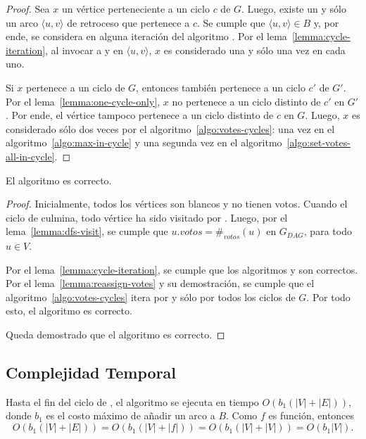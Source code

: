 \begin{proof}
    Sea $x$ un v\'ertice perteneciente a un ciclo $c$ de $G$. Luego, existe un y s\'olo un arco $\langle u, v \rangle$ de retroceso que pertenece a $c$. Se cumple que $\langle u, v \rangle \in B$ y, por ende, se considera en alguna iteraci\'on del algoritmo \cyclevotescaption. Por el lema~\ref{lemma:cycle-iteration}, al invocar a \maxincyclecaption \;y \setvotestoallincyclecaption \;en $\langle u, v \rangle$, $x$ es considerado una y s\'olo una vez en cada uno. 

    Si $x$ pertenece a un ciclo de $G$, entonces tambi\'en pertenece a un ciclo  $c'$ de $G'$. Por el lema~\ref{lemma:one-cycle-only}, $x$ no pertenece a un ciclo distinto de $c'$ en $G'$. Por ende, el v\'ertice tampoco pertenece a un ciclo distinto de $c$ en $G$. Luego, $x$ es considerado s\'olo dos veces por el algoritmo~\ref{algo:votes-cycles}: una vez en el algoritmo~\ref{algo:max-in-cycle} y una segunda vez en el algoritmo~\ref{algo:set-votes-all-in-cycle}.
\end{proof}



\begin{theorem}
    El algoritmo \dfscaption \;es correcto.
\end{theorem}

\begin{proof}
    Inicialmente, todos los v\'ertices son blancos y no tienen votos. Cuando el ciclo de \dfscaption \;culmina, todo v\'ertice ha sido visitado por \dfsvisitcaption. Luego, por el lema~\ref{lemma:dfs-visit}, se cumple que $u.votos = \#_{votos}(u)$ en $G_{DAG}$, para todo $u \in V$.

    Por el lema~\ref{lemma:cycle-iteration}, se cumple que los algoritmos \maxincyclecaption \;y \setvotestoallincyclecaption \;son correctos.  Por el lema~\ref{lemma:reassign-votes} y su demostraci\'on, se cumple que el algoritmo~\ref{algo:votes-cycles} itera por y s\'olo por todos los ciclos de $G$. Por todo esto, el algoritmo \cyclevotescaption \;es correcto.

    Queda demostrado que el algoritmo \dfscaption \;es correcto.
\end{proof}


\subsection{Complejidad Temporal}
Hasta el fin del ciclo de \dfscaption, el algoritmo se ejecuta en tiempo $O(b_1(|V| + |E|))$, donde $b_1$ es el costo m\'aximo de a\~nadir un arco a $B$. Como $f$ es funci\'on, entonces 
$$
O(b_1(|V| + |E|)) = O(b_1(|V| + |f|)) = O(b_1(|V| + |V|)) = O(b_1|V|).
$$

